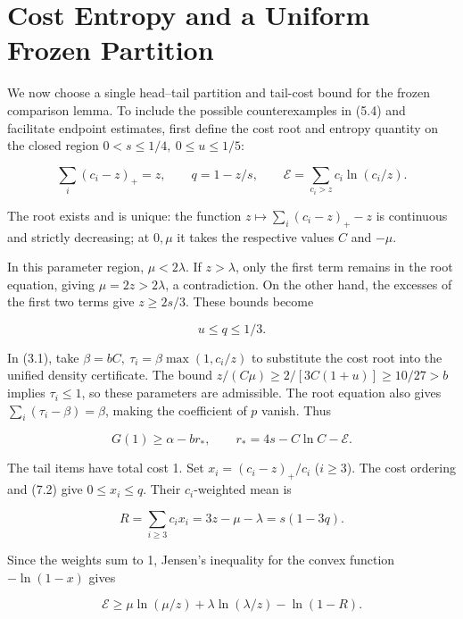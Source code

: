 \documentclass[11pt,a4paper]{article}
\begin{document}
\section{Cost Entropy and a Uniform Frozen Partition}

We now choose a single head--tail partition and tail-cost bound for the frozen comparison lemma. To include the possible counterexamples in (5.4) and facilitate endpoint estimates, first define the cost root and entropy quantity on the closed region $0<s\le1/4,\ 0\le u\le1/5$:

\begin{equation}
\sum_i(c_i-z)_+=z,\qquad q=1-z/s,\qquad
\mathcal E=\sum_{c_i>z}c_i\ln(c_i/z).
\tag{7.1}
\end{equation}

The root exists and is unique: the function $z\mapsto\sum_i(c_i-z)_+-z$ is continuous and strictly decreasing; at $0,\mu$ it takes the respective values $C$ and $-\mu$.

In this parameter region, $\mu<2\lambda$. If $z>\lambda$, only the first term remains in the root equation, giving $\mu=2z>2\lambda$, a contradiction. On the other hand, the excesses of the first two terms give $z\ge2s/3$. These bounds become

\begin{equation}
u\le q\le1/3.
\tag{7.2}
\end{equation}

In (3.1), take $\beta=bC,\ \tau_i=\beta\max(1,c_i/z)$ to substitute the cost root into the unified density certificate.
The bound $z/(C\mu)\ge2/[3C(1+u)]\ge10/27>b$ implies $\tau_i\le1$, so these parameters are admissible.
The root equation also gives $\sum_i(\tau_i-\beta)=\beta$, making the coefficient of $p$ vanish. Thus

\begin{equation}
G(1)\ge\alpha-br_*,
\qquad r_*=4s-C\ln C-\mathcal E.
\tag{7.3}
\end{equation}

The tail items have total cost 1. Set $x_i=(c_i-z)_+/c_i$ ($i\ge3$). The cost ordering and (7.2) give $0\le x_i\le q$. Their $c_i$-weighted mean is

\begin{equation}
R=\sum_{i\ge3}c_ix_i=3z-\mu-\lambda=s(1-3q).
\tag{7.4}
\end{equation}

Since the weights sum to 1, Jensen's inequality for the convex function $-\ln(1-x)$ gives

\begin{equation}
\mathcal E\ge\mu\ln(\mu/z)+\lambda\ln(\lambda/z)-\ln(1-R).
\tag{7.5}
\end{equation}
\end{document}
